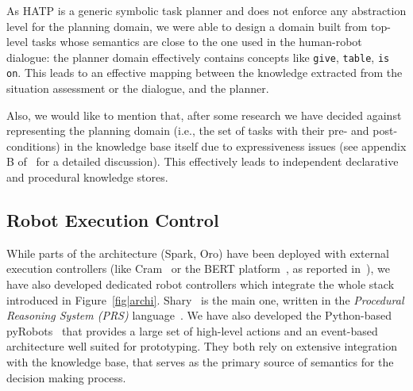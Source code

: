 \documentclass[preprint,3p,times]{elsarticle}
\newcommand{\ie}{i.e.\xspace}
\begin{document}
%
%
%

As HATP is a generic symbolic task planner and does not enforce any abstraction
level for the planning domain, we were able to design a domain built from
top-level tasks whose semantics are close to the one used in the human-robot
dialogue: the planner domain effectively contains concepts like \texttt{give},
\texttt{table}, \texttt{is on}. This leads to an effective mapping between the
knowledge extracted from the situation assessment or the dialogue, and the
planner.

Also, we would like to mention that, after some research we have decided against
representing the planning domain (\ie, the set of tasks with their pre- and
post-conditions) in the knowledge base itself due to expressiveness issues (see
appendix B of~\cite{Lemaignan2012a} for a detailed discussion). This effectively
leads to independent declarative and procedural knowledge stores.

\subsection{Robot Execution Control}
\label{sect|ctrl}

While parts of the architecture ({\sc Spark}, {\sc Oro}) have been deployed with
external execution controllers (like {\sc Cram}~\cite{Beetz2010} or the BERT
platform~\cite{Lallee2010b}, as reported in~\cite{Lemaignan2010}), we have also
developed dedicated robot controllers which integrate the whole stack introduced
in Figure~\ref{fig|archi}. {\sc Shary}~\cite{clodic2009} is the main one,
written in the \emph{Procedural Reasoning System (PRS)} language~\cite{Ingrand1996}.
We have also developed the Python-based {\sc pyRobots}~\cite{lemaignan2015pyrobots} that
provides a large set of high-level actions and an event-based architecture well
suited for prototyping. They both rely on extensive integration with the knowledge
base, that serves as the primary source of semantics for the decision making process.
\end{document}
